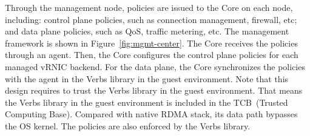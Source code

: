 
Through the management node, policies are issued to the \sys Core on each node, including: control plane policies, such as connection management, firewall, etc;  and data plane policies, such as QoS, traffic metering, etc. The management framework is shown in Figure~\ref{fig:mgmt-center}. The \sys Core receives the policies through an agent. Then, the \sys Core configures the control plane policies for each managed vRNIC backend.
For the data plane, the \sys Core synchronizes the policies with the agent in the Verbs library in the guest environment.
Note that this design requires \sys to trust the Verbs library in the guest environment. That means the Verbs library in the guest environment is included in the TCB~(Trusted Computing Base). Compared with native RDMA stack, its data path bypasses the OS kernel. The policies are also enforced by the Verbs library.



